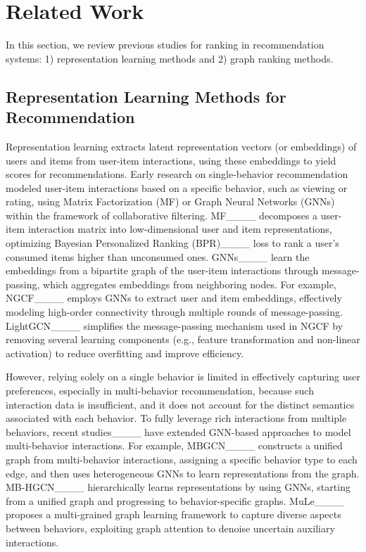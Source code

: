 \section{Related Work}
\label{sec:related}
In this section, we review previous studies for ranking in recommendation systems: 1) representation learning methods and 2) graph ranking methods.

\subsection{Representation Learning Methods for Recommendation}
\label{sec:related:rl}
Representation learning extracts latent representation vectors (or embeddings) of users and items from user-item interactions, using these embeddings to yield scores for recommendations.
Early research on single-behavior recommendation modeled user-item interactions based on a specific behavior, such as viewing or rating, using Matrix Factorization (MF) or Graph Neural Networks (GNNs) within the framework of collaborative filtering.
MF____ decomposes a user-item interaction matrix into low-dimensional user and item representations, optimizing Bayesian Personalized Ranking (BPR)____ loss to rank a user’s consumed items higher than unconsumed ones.
GNNs____ learn the embeddings from a bipartite graph of the user-item interactions through message-passing, which aggregates embeddings from neighboring nodes.
For example, NGCF____ employs GNNs to extract user and item embeddings, effectively modeling high-order connectivity through multiple rounds of message-passing. 
LightGCN____ simplifies the message-passing mechanism used in NGCF by removing several learning components (e.g., feature transformation and non-linear activation) to reduce overfitting and improve  efficiency.

However, relying solely on a single behavior is limited in effectively capturing user preferences, especially in multi-behavior recommendation, because such interaction data is insufficient, and it does not account for the distinct semantics associated with each behavior.
To fully leverage rich interactions from  multiple behaviors, recent studies____ have extended GNN-based approaches to model multi-behavior interactions.
For example, MBGCN____ constructs a unified graph from multi-behavior interactions, assigning a specific behavior type to each edge, and then uses heterogeneous GNNs to learn representations from the graph.
MB-HGCN____ hierarchically learns representations by using GNNs, starting from a unified graph and progressing to behavior-specific graphs.
MuLe____ proposes a multi-grained graph learning framework to capture diverse aspects between behaviors, exploiting graph attention to denoise uncertain auxiliary interactions.

